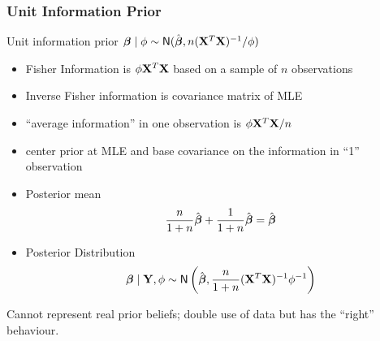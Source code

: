 \documentclass[handout]{beamer}
\begin{document}
\begin{frame}
  \frametitle{Unit Information Prior}

Unit information prior $\boldsymbol{\beta} \mid \phi \sim \textsf{N}(\hat{\boldsymbol{\beta}}, n
   (\mathbf{X}^T\mathbf{X})^{-1}/\phi)$ \pause
  \begin{itemize}
\item Fisher Information is $\phi \mathbf{X}^T\mathbf{X}$ based on a sample of $n$
  observations \pause
\item Inverse Fisher information is covariance matrix of MLE \pause
\item ``average information'' in one observation is  $\phi \mathbf{X}^T\mathbf{X} /n$ \pause
\item center prior at MLE and base covariance on the information in
  ``1'' observation \pause
\item  Posterior mean 
$$\frac{n}{1 + n} \hat{\boldsymbol{\beta}} +  \frac{1}{1 + n}\hat{\boldsymbol{\beta}} = \hat{\boldsymbol{\beta}}$$ \pause
\item Posterior Distribution 
$$\boldsymbol{\beta} \mid \mathbf{Y}, \phi \sim \textsf{N}\left( \hat{\boldsymbol{\beta}}, \frac{n}{1 + n} (\mathbf{X}^T\mathbf{X})^{-1}
  \phi^{-1} \right)$$ \pause
    \end{itemize}
Cannot represent real prior beliefs; double use of data but has the
``right'' behaviour.  
\end{frame}
\end{document}

